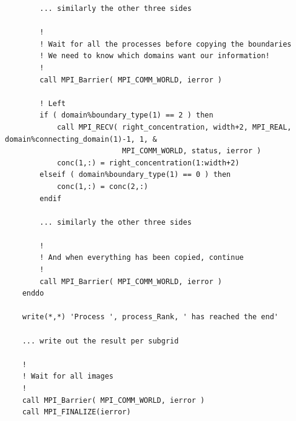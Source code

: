 \documentclass[onecolumn]{article}
\begin{document}
\begin{small}
\begin{verbatim}
        ... similarly the other three sides

        !
        ! Wait for all the processes before copying the boundaries
        ! We need to know which domains want our information!
        !
        call MPI_Barrier( MPI_COMM_WORLD, ierror )

        ! Left
        if ( domain%boundary_type(1) == 2 ) then
            call MPI_RECV( right_concentration, width+2, MPI_REAL, domain%connecting_domain(1)-1, 1, &
                           MPI_COMM_WORLD, status, ierror )
            conc(1,:) = right_concentration(1:width+2)
        elseif ( domain%boundary_type(1) == 0 ) then
            conc(1,:) = conc(2,:)
        endif

        ... similarly the other three sides

        !
        ! And when everything has been copied, continue
        !
        call MPI_Barrier( MPI_COMM_WORLD, ierror )
    enddo

    write(*,*) 'Process ', process_Rank, ' has reached the end'

    ... write out the result per subgrid

    !
    ! Wait for all images
    !
    call MPI_Barrier( MPI_COMM_WORLD, ierror )
    call MPI_FINALIZE(ierror)
\end{verbatim}
\end{small}



\end{document}
